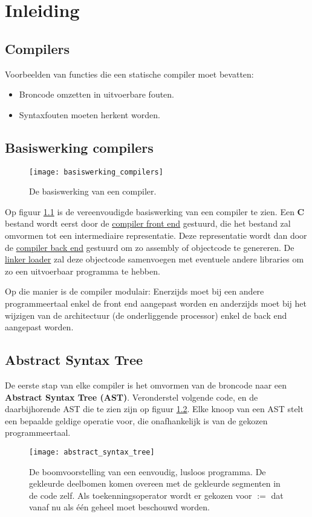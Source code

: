 \chapter{Inleiding}
\section{Compilers}
Voorbeelden van functies die een statische compiler moet bevatten:
	\begin{itemize}
		\item Broncode omzetten in uitvoerbare fouten.
		\item Syntaxfouten moeten herkent worden.
	\end{itemize}

\section{Basiswerking compilers}
\begin{figure}[h]
	\centering
	\texttt{[image: basiswerking\_compilers]}
	\caption{De basiswerking van een compiler.} 
	\label{fig:basiswerking_compilers}
\end{figure}
Op figuur \ref{fig:basiswerking_compilers} is de vereenvoudigde basiswerking van een compiler te zien. Een \textbf{C} bestand wordt eerst door de \uline{compiler front end} gestuurd, die het bestand zal omvormen tot een intermediaire representatie. Deze representatie wordt dan door de \uline{compiler back end} gestuurd om zo assembly of objectcode te genereren. De \uline{linker loader} zal deze objectcode samenvoegen met eventuele andere libraries om zo een uitvoerbaar programma te hebben. 

{Op die manier is de compiler modulair: Enerzijds moet bij een andere programmeertaal enkel de front end aangepast worden en anderzijds moet bij het wijzigen van de architectuur (de onderliggende processor) enkel de back end aangepast worden.}


\section{Abstract Syntax Tree}
De eerste stap van elke compiler is het omvormen van de broncode naar een \textbf{Abstract Syntax Tree (AST)}. Veronderstel volgende code, en de daarbijhorende AST die te zien zijn op figuur \ref{fig:abstract_syntax_tree}. Elke knoop van een AST stelt een bepaalde geldige operatie voor, die onafhankelijk is van de gekozen programmeertaal.
\begin{figure}[h]
	\centering
	\texttt{[image: abstract\_syntax\_tree]}
	\caption{De boomvoorstelling van een eenvoudig, lusloos programma. De gekleurde deelbomen komen overeen met de gekleurde segmenten in de code zelf. Als toekenningsoperator wordt er gekozen voor $:=$ dat vanaf nu als één geheel moet beschouwd worden.}
	\label{fig:abstract_syntax_tree}
\end{figure}

